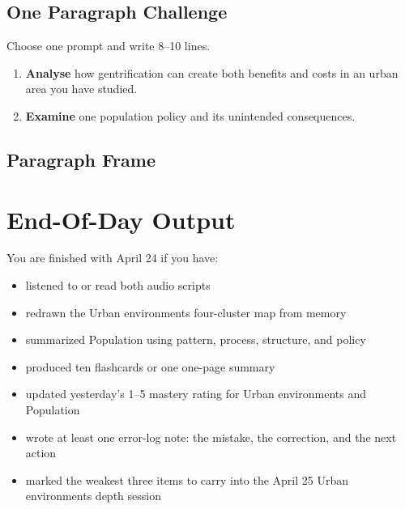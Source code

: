 \documentclass[11pt,a4paper]{article}
\newcommand{\exam}[1]{\textcolor{AccentTeal}{\textbf{#1}}}
\begin{document}
\subsection{One Paragraph Challenge}

Choose one prompt and write 8--10 lines.

\begin{enumerate}
  \item \exam{Analyse} how gentrification can create both benefits and costs in
  an urban area you have studied.
  \item \exam{Examine} one population policy and its unintended consequences.
\end{enumerate}

\subsection{Paragraph Frame}

\noindent{}

\section{End-Of-Day Output}

You are finished with April 24 if you have:

\begin{itemize}
  \item listened to or read both audio scripts
  \item redrawn the Urban environments four-cluster map from memory
  \item summarized Population using pattern, process, structure, and policy
  \item produced ten flashcards or one one-page summary
  \item updated yesterday's 1--5 mastery rating for Urban environments and
  Population
  \item wrote at least one error-log note: the mistake, the correction, and the
  next action
  \item marked the weakest three items to carry into the April 25 Urban
  environments depth session
\end{itemize}
\end{document}
